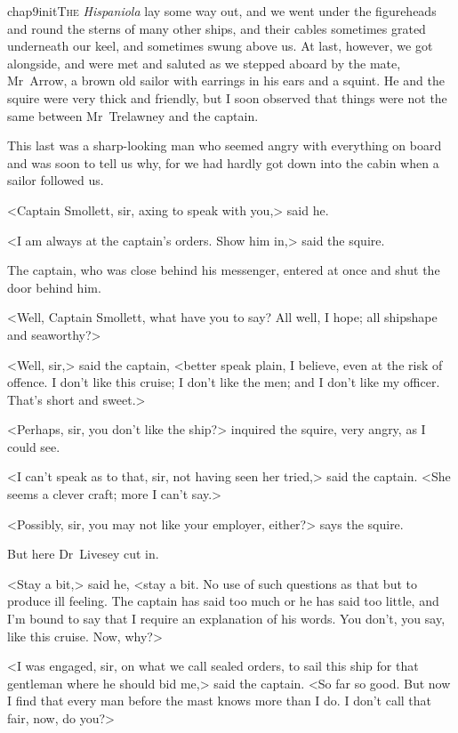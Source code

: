 
\lettrine{chap9initT}{he} \textit{Hispaniola} lay some way out, and we went under the figureheads and round the sterns of many other ships, and their cables sometimes grated underneath our keel, and sometimes swung above us. At last, however, we got alongside, and were met and saluted as we stepped aboard by the mate, Mr~Arrow, a brown old sailor with earrings in his ears and a squint. He and the squire were very thick and friendly, but I soon observed that things were not the same between Mr~Trelawney and the captain.

This last was a sharp-looking man who seemed angry with everything on board and was soon to tell us why, for we had hardly got down into the cabin when a sailor followed us.

<Captain Smollett, sir, axing to speak with you,> said he.

<I am always at the captain's orders. Show him in,> said the squire.

The captain, who was close behind his messenger, entered at once and shut the door behind him.

<Well, Captain Smollett, what have you to say? All well, I hope; all shipshape and seaworthy?>

<Well, sir,> said the captain, <better speak plain, I believe, even at the risk of offence. I don't like this cruise; I don't like the men; and I don't like my officer. That's short and sweet.>

<Perhaps, sir, you don't like the ship?> inquired the squire, very angry, as I could see.

<I can't speak as to that, sir, not having seen her tried,> said the captain. <She seems a clever craft; more I can't say.>

<Possibly, sir, you may not like your employer, either?> says the squire.

But here Dr~Livesey cut in.

<Stay a bit,> said he, <stay a bit. No use of such questions as that but to produce ill feeling. The captain has said too much or he has said too little, and I'm bound to say that I require an explanation of his words. You don't, you say, like this cruise. Now, why?>

<I was engaged, sir, on what we call sealed orders, to sail this ship for that gentleman where he should bid me,> said the captain. <So far so good. But now I find that every man before the mast knows more than I do. I don't call that fair, now, do you?>

